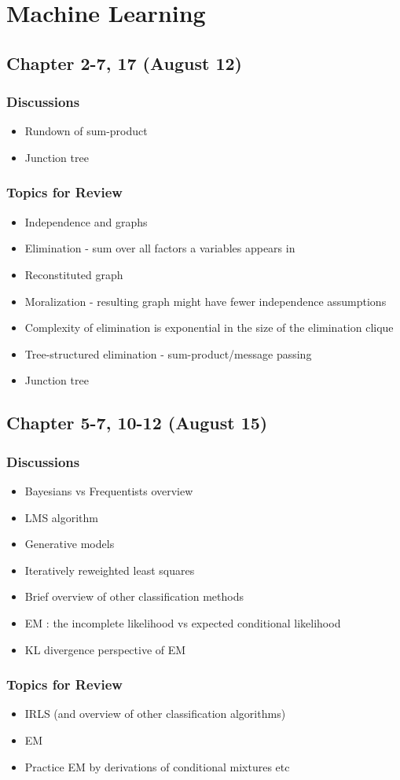 \section{Machine Learning}

\subsection{Chapter 2-7, 17 (August 12)}

\subsubsection*{Discussions}
\begin{itemize}
\item Rundown of sum-product
\item Junction tree
\end{itemize}

\subsubsection*{Topics for Review}
\begin{itemize}
\item Independence and graphs
\item Elimination - sum over all factors a variables appears in
\item Reconstituted graph
\item Moralization - resulting graph might have fewer independence assumptions
\item Complexity of elimination is exponential in the size of the elimination clique
\item Tree-structured elimination - sum-product/message passing
\item Junction tree
\end{itemize}


\subsection{Chapter 5-7, 10-12 (August 15)}

\subsubsection*{Discussions}
\begin{itemize}
\item Bayesians vs Frequentists overview
\item LMS algorithm
\item Generative models 
\item Iteratively reweighted least squares
\item Brief overview of other classification methods
\item EM : the incomplete likelihood vs expected conditional likelihood
\item KL divergence perspective of EM
\end{itemize}

\subsubsection*{Topics for Review}
\begin{itemize}
\item IRLS (and overview of other classification algorithms)
\item EM
\item Practice EM by derivations of conditional mixtures etc
\end{itemize}